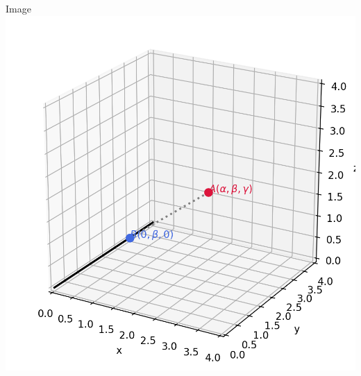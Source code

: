 \documentclass{beamer}
\begin{document}
\begin{frame}{Image}
   \centering
    \includegraphics[width=\columnwidth, height=0.8\textheight, keepaspectratio]{figs/fig1.png}
    \label{fig:Beamer/figs/fig1.png}
\end{frame}
\end{document}
